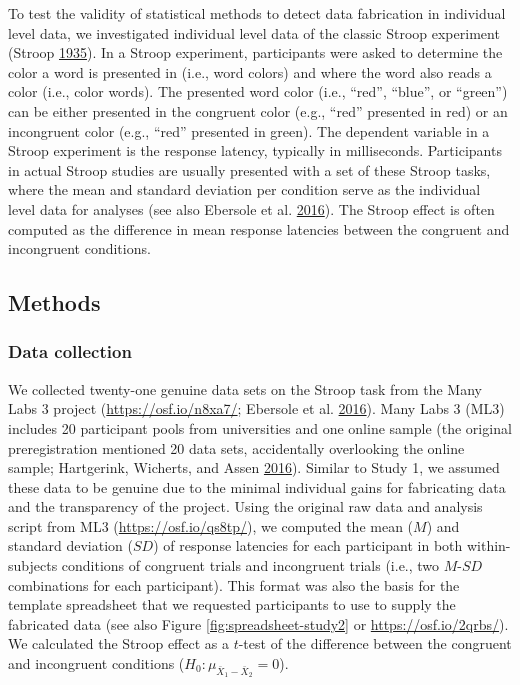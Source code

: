 \documentclass[a5paper]{book}
\begin{document}
To test the validity of statistical methods to detect data fabrication
in individual level data, we investigated individual level data of the
classic Stroop experiment (Stroop
\protect\hyperlink{ref-doi:10.1037ux2fh0054651}{1935}). In a Stroop
experiment, participants were asked to determine the color a word is
presented in (i.e., word colors) and where the word also reads a color
(i.e., color words). The presented word color (i.e., \enquote{red},
\enquote{blue}, or \enquote{green}) can be either presented in the
congruent color (e.g., \enquote{red} presented in red) or an incongruent
color (e.g., \enquote{red} presented in green). The dependent variable
in a Stroop experiment is the response latency, typically in
milliseconds. Participants in actual Stroop studies are usually
presented with a set of these Stroop tasks, where the mean and standard
deviation per condition serve as the individual level data for analyses
(see also Ebersole et al.
\protect\hyperlink{ref-doi:10.1016ux2fj.jesp.2015.10.012}{2016}). The
Stroop effect is often computed as the difference in mean response
latencies between the congruent and incongruent conditions.

\subsection{Methods}\label{methods-3}

\subsubsection{Data collection}\label{data-collection-1}

We collected twenty-one genuine data sets on the Stroop task from the
Many Labs 3 project (\url{https://osf.io/n8xa7/}; Ebersole et al.
\protect\hyperlink{ref-doi:10.1016ux2fj.jesp.2015.10.012}{2016}). Many
Labs 3 (ML3) includes 20 participant pools from universities and one
online sample (the original preregistration mentioned 20 data sets,
accidentally overlooking the online sample; Hartgerink, Wicherts, and
Assen \protect\hyperlink{ref-doi:10.3897ux2frio.2.e8860}{2016}). Similar
to Study 1, we assumed these data to be genuine due to the minimal
individual gains for fabricating data and the transparency of the
project. Using the original raw data and analysis script from ML3
(\url{https://osf.io/qs8tp/}), we computed the mean (\(M\)) and standard
deviation (\(SD\)) of response latencies for each participant in both
within-subjects conditions of congruent trials and incongruent trials
(i.e., two \(M\)-\(SD\) combinations for each participant). This format
was also the basis for the template spreadsheet that we requested
participants to use to supply the fabricated data (see also Figure
\ref{fig:spreadsheet-study2} or \url{https://osf.io/2qrbs/}). We
calculated the Stroop effect as a \(t\)-test of the difference between
the congruent and incongruent conditions
(\(H_0:\mu_{\bar{X}_1-\bar{X}_2}=0\)).
\end{document}
